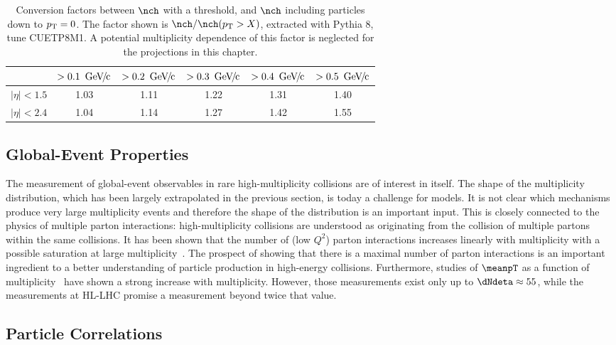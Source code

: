 \documentclass[../report.tex]{subfiles}
\begin{document}
\begin{table}
\centering
\begin{tabular}{c|c|c|c|c|c}
\backslashbox{$|\eta|$}{$\pT$} & $> \unit[0.1]{\UGeVc}$ & $> \unit[0.2]{\UGeVc}$ & $> \unit[0.3]{\UGeVc}$ & $> \unit[0.4]{\UGeVc}$ & $> \unit[0.5]{\UGeVc}$ \\
\hline
$|\eta| < 1.5$ & 1.03 & 1.11 & 1.22 & 1.31 & 1.40 \\
\hline
$|\eta| < 2.4$ & 1.04 & 1.14 & 1.27 & 1.42 & 1.55 \\
\hline
\end{tabular}
\caption{Conversion factors between $\nch$ with a \pT threshold, and $\nch$ including particles down to $p\sb{\scriptstyle\mathrm{T}} = 0$. The factor shown is $\nch / \nch(\pT > X)$, extracted with Pythia 8, tune CUETP8M1. A potential multiplicity dependence of this factor is neglected for the projections in this chapter.}
\label{tab:smallsystems_conversion}
\end{table}

\subsection{Global-Event Properties}
\label{sect:smallsystems_global}
  
The measurement of global-event observables in rare high-multiplicity \pp collisions are of interest in itself. The shape of the multiplicity distribution, which has been largely extrapolated in the previous section, is today a challenge for models. It is not clear which mechanisms produce very large multiplicity events and therefore the shape of the distribution is an important input. 
This is closely connected to the physics of multiple parton interactions: high-multiplicity collisions are understood as originating from the collision of multiple partons within the same \pp collisions. It has been shown that the number of (low $Q^2$) parton interactions increases linearly with multiplicity with a possible saturation at large multiplicity~\cite{Abelev:2013sqa}. The prospect of showing that there is a maximal number of parton interactions is an important ingredient to a better understanding of particle production in high-energy \pp collisions.
Furthermore, studies of $\meanpT$ as a function of multiplicity~\cite{Abelev:2013bla} have shown a strong increase with multiplicity. However, those measurements exist only up to $\dNdeta \approx 55$, while the measurements at HL-LHC promise a measurement beyond twice that value. 

\subsection{Particle Correlations}
\label{sect:smallsystems_correlations}
\end{document}
